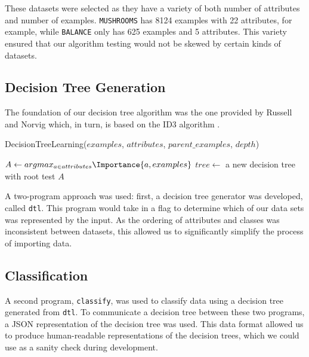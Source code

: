 \documentclass[screen, authorversion, nonacm, sigconf]{acmart}
\begin{document}
These datasets were selected as they have a variety of both number of attributes and number of examples. \texttt{MUSHROOMS} has 8124 examples with 22 attributes, for example, while \texttt{BALANCE} only has 625 examples and 5 attributes. This variety ensured that our algorithm testing would not be skewed by certain kinds of datasets.

\subsection{Decision Tree Generation}

The foundation of our decision tree algorithm was the one provided by Russell and Norvig \cite{russell_norvig_2010} which, in turn, is based on the ID3 algorithm \cite{Quinlan1986}.

\begin{function}
	\SetAlgoLined
  \caption{DecisionTreeLearning($examples$, $attributes$, $parent\_examples$, $depth$)}
  \label{algo:DecisionTreeLearning}
  $A \gets argmax_{a \in attributes} \Importance{a, examples}$\;
  $tree \gets$ a new decision tree with root test $A$\;
  \;
\end{function}

A two-program approach was used: first, a decision tree generator was developed, called \texttt{dtl}. This program would take in a flag to determine which of our data sets was represented by the input. As the ordering of attributes and classes was inconsistent between datasets, this allowed us to significantly simplify the process of importing data.

\subsection{Classification}

A second program, \texttt{classify}, was used to classify data using a decision tree generated from \texttt{dtl}. To communicate a decision tree between these two programs, a JSON representation of the decision tree was used. This data format allowed us to produce human-readable representations of the decision trees, which we could use as a sanity check during development.
\end{document}
